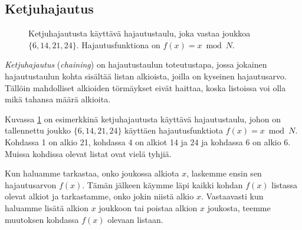 \subsection{Ketjuhajautus}

\begin{figure}
\center
{}
\caption{Ketjuhajautusta käyttävä hajautustaulu, joka vastaa joukkoa $\{6,14,21,24\}$.
Hajautusfunktiona on $f(x)=x \bmod N$.}
\label{fig:hajtau}
\end{figure}


\emph{Ketjuhajautus} (\emph{chaining})
on hajautustaulun toteutustapa, jossa jokainen hajautustaulun kohta
sisältää listan alkioista,
joilla on kyseinen hajautusarvo.
Tällöin mahdolliset alkioiden törmäykset eivät haittaa,
koska listoissa voi olla mikä tahansa määrä alkioita.

Kuvassa \ref{fig:hajtau} on esimerkkinä
ketjuhajautusta käyttävä hajautustaulu,
johon on tallennettu joukko $\{6,14,21,24\}$
käyttäen hajautusfunktiota $f(x)=x \bmod N$.
Kohdassa 1 on alkio 21, kohdassa 4 on alkiot 14 ja 24
ja kohdassa 6 on alkio 6.
Muissa kohdissa olevat listat ovat vielä tyhjiä.

Kun haluamme tarkastaa, onko joukossa alkiota $x$,
laskemme ensin sen hajautusarvon $f(x)$.
Tämän jälkeen käymme läpi kaikki kohdan $f(x)$
listassa olevat alkiot ja tarkastamme,
onko jokin niistä alkio $x$.
Vastaavasti kun haluamme lisätä alkion $x$ joukkoon
tai poistaa alkion $x$ joukosta,
teemme muutoksen kohdassa $f(x)$ olevaan listaan.

